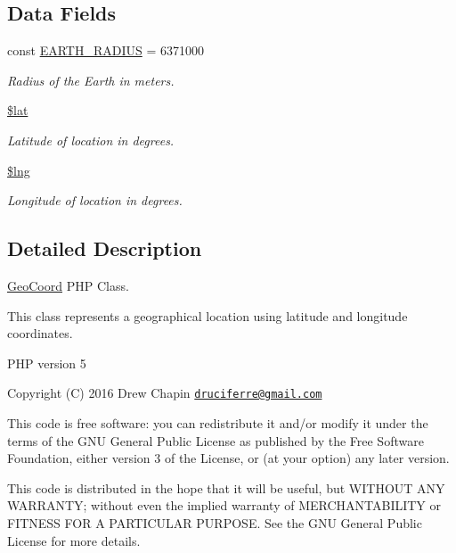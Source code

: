 \subsection*{Data Fields}
\begin{DoxyCompactItemize}
\item 
const \hyperlink{class_geo_coord_aabaad7a967695e8a9cce7a62bd266873}{E\+A\+R\+T\+H\+\_\+\+R\+A\+D\+I\+US} = 6371000
\begin{DoxyCompactList}\small\item\em Radius of the Earth in meters. \end{DoxyCompactList}\item 
\hyperlink{class_geo_coord_af498b42b83afed4dfe0af05fd802776c}{\$lat}
\begin{DoxyCompactList}\small\item\em Latitude of location in degrees. \end{DoxyCompactList}\item 
\hyperlink{class_geo_coord_ab27bfa6a9380a8d89e1a8e001b276410}{\$lng}
\begin{DoxyCompactList}\small\item\em Longitude of location in degrees. \end{DoxyCompactList}\end{DoxyCompactItemize}


\subsection{Detailed Description}
\hyperlink{class_geo_coord}{Geo\+Coord} P\+HP Class.

This class represents a geographical location using latitude and longitude coordinates.

P\+HP version 5

Copyright (C) 2016 Drew Chapin \href{mailto:druciferre@gmail.com}{\tt druciferre@gmail.\+com}

This code is free software\+: you can redistribute it and/or modify it under the terms of the G\+NU General Public License as published by the Free Software Foundation, either version 3 of the License, or (at your option) any later version.

This code is distributed in the hope that it will be useful, but W\+I\+T\+H\+O\+UT A\+NY W\+A\+R\+R\+A\+N\+TY; without even the implied warranty of M\+E\+R\+C\+H\+A\+N\+T\+A\+B\+I\+L\+I\+TY or F\+I\+T\+N\+E\+SS F\+OR A P\+A\+R\+T\+I\+C\+U\+L\+AR P\+U\+R\+P\+O\+SE. See the G\+NU General Public License for more details.

